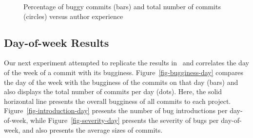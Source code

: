 \begin{figure}[tbh]
\centering
{}
\caption{\label{fig-bugginess-experience}Percentage of buggy commits (bars) and total number of commits (circles) versus author experience}
\end{figure}





\subsection{Day-of-week Results}
\label{sec-day-of-week}
Our next experiment attempted to replicate the results
in~\cite{sliwerski-msr-2005} and correlates the day of the week
of a commit with its bugginess. Figure~\ref{fig-bugginess-day} 
compares the day of the week
with the bugginess of the commits on that day (bars) and also displays
the total number of commits per day (dots). Here, the solid
horizontal line presents the overall bugginess of all commits to
each project. 
Figure~\ref{fig-introduction-day} presents the number of bug introductions per day-of-week, while
Figure~\ref{fig-severity-day} 
presents the severity of bugs per day-of-week, and also presents the average
sizes of commits.


